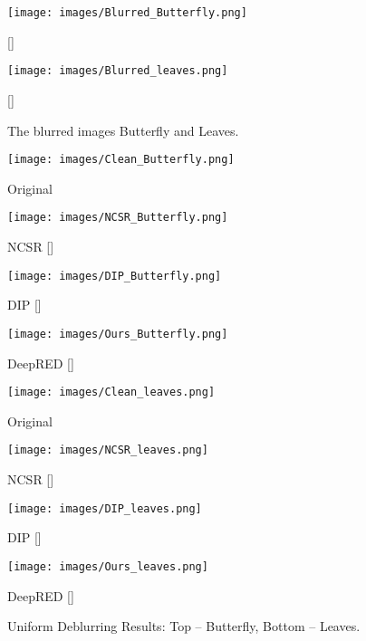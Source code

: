 \documentclass[12pt]{article}
\begin{document}
\begin{figure}[t]
    \centering
      \texttt{[image: images/Blurred\_Butterfly.png]}
      \caption*{[]}
    \endminipage
    \hspace{0.01\linewidth}
    \texttt{[image: images/Blurred\_leaves.png]}
      \caption*{[]}
    \endminipage
    \caption{The blurred images \textsf{Butterfly} and \textsf{Leaves}.}
    \label{fig:blurred_images_uniform}
\end{figure}

\begin{figure*}[!ht]
\texttt{[image: images/Clean\_Butterfly.png]}
  \caption*{Original}
\endminipage
\hspace{0.005\textwidth}
\texttt{[image: images/NCSR\_Butterfly.png]}
  \caption*{NCSR []}
\endminipage
\hspace{0.005\textwidth}
\texttt{[image: images/DIP\_Butterfly.png]}
  \caption*{DIP []}
\endminipage
\hspace{0.005\textwidth}
\texttt{[image: images/Ours\_Butterfly.png]}
  \caption*{DeepRED []}
  \endminipage

\texttt{[image: images/Clean\_leaves.png]}
  \caption*{Original}
\endminipage
\hspace{0.005\textwidth}
\texttt{[image: images/NCSR\_leaves.png]}
  \caption*{NCSR []}
\endminipage
\hspace{0.005\textwidth}
\texttt{[image: images/DIP\_leaves.png]}
  \caption*{DIP []}
\endminipage
\hspace{0.005\textwidth}
\texttt{[image: images/Ours\_leaves.png]}
  \caption*{DeepRED []}
  \endminipage

\caption{Uniform Deblurring Results: Top -- \textsf{Butterfly}, Bottom -- \textsf{Leaves}.}
\label{fig:deblur_uniform}
\end{figure*}
\end{document}
